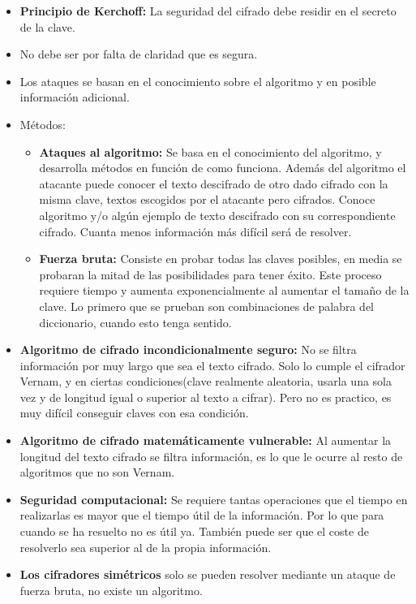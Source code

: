 \documentclass[12pt, twoside, openright]{report} %
\begin{document}
  \begin{itemize}
  \item \textbf{Principio de Kerchoff:} La seguridad del cifrado debe
    residir en el secreto de la clave.
    
  \item No debe ser por falta de claridad que es segura.
    
  \item Los ataques se basan en el conocimiento sobre el algoritmo y en
    posible información adicional.
    
  \item Métodos:
    
    \begin{itemize}
    \item \textbf{Ataques al algoritmo:} Se basa en el conocimiento del
      algoritmo, y desarrolla métodos en función de como funciona.
      Además del algoritmo el atacante puede conocer el texto descifrado
      de otro dado cifrado con la misma clave, textos escogidos por el
      atacante pero cifrados. Conoce algoritmo y/o algún ejemplo de
      texto descifrado con su correspondiente cifrado. Cuanta menos
      información más difícil será de resolver.
      
    \item \textbf{Fuerza bruta:} Consiste en probar todas las claves
      posibles, en media se probaran la mitad de las posibilidades para
      tener éxito. Este proceso requiere tiempo y aumenta
      exponencialmente al aumentar el tamaño de la clave. Lo primero que
      se prueban son combinaciones de palabra del diccionario, cuando
      esto tenga sentido.
      
    \end{itemize}
  \item \textbf{Algoritmo de cifrado incondicionalmente seguro:} No se
    filtra información por muy largo que sea el texto cifrado. Solo lo
    cumple el cifrador Vernam, y en ciertas condiciones(clave realmente
    aleatoria, usarla una sola vez y de longitud igual o superior al
    texto a cifrar). Pero no es practico, es muy difícil conseguir
    claves con esa condición.
    
  \item \textbf{Algoritmo de cifrado matemáticamente vulnerable:} Al
    aumentar la longitud del texto cifrado se filtra información, es lo
    que le ocurre al resto de algoritmos que no son Vernam.
    
  \item \textbf{Seguridad computacional:} Se requiere tantas operaciones que
    el tiempo en realizarlas es mayor que el tiempo útil de la
    información. Por lo que para cuando se ha resuelto no es útil ya.
    También puede ser que el coste de resolverlo sea superior al de la
    propia información.
    
  \item \textbf{Los cifradores simétricos} solo se pueden resolver mediante
    un ataque de fuerza bruta, no existe un algoritmo.
    
  \end{itemize}
\end{document}
